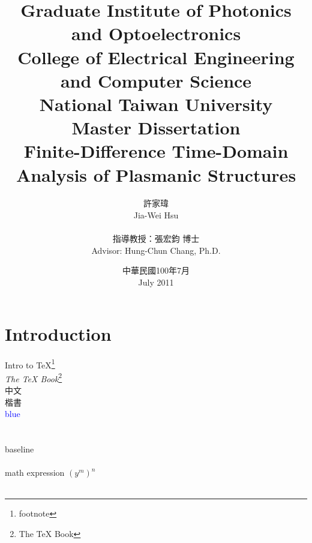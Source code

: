 \documentclass{book}
\begin{document}
\title{
  \rm{Graduate Institute of Photonics and Optoelectronics\\College of Electrical Engineering and Computer Science\\National Taiwan University\\Master Dissertation\\[1cm]}
  \rm{Finite-Difference Time-Domain Analysis of Plasmanic Structures}
}
\author{
  \kai 許家瑋\\ \rm Jia-Wei Hsu\\\\
  \kai 指導教授：張宏鈞 博士\\ \rm Advisor: Hung-Chun Chang, Ph.D.
}
\date{
  \kai 中華民國100年7月\\ 
  \rm July 2011
}

\maketitle
{}

\chapter{Introduction}
Intro to \TeX\footnote{footnote}\\
\textit{The TeX Book}\footnote{The TeX Book}\\
\msjh 中文\rmfamily \\
\kai 楷書\rmfamily \\
\textcolor{blue}{blue}\\
\\ \\
baseline \raisebox{1ex}{upward}\raisebox{-1ex}{downward}\\\\
math expression $ (y^m)^n $ \\\\
\end{document}
